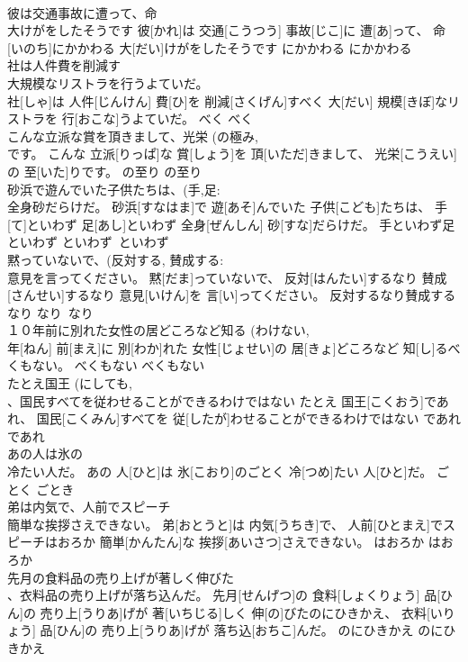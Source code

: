\documentclass[8pt]{extreport}
\begin{document}
\begin{CJK}{UTF8}{min}
\\	彼は交通事故に遭って、命 
\\	大けがをしたそうです	彼[かれ]は 交通[こうつう] 事故[じこ]に 遭[あ]って、 命[いのち]にかかわる 大[だい]けがをしたそうです	にかかわる	にかかわる	
\\	社は人件費を削減す 
\\	大規模なリストラを行うよていだ。	
\\	社[しゃ]は 人件[じんけん] 費[ひ]を 削減[さくげん]すべく 大[だい] 規模[きぼ]なリストラを 行[おこな]うよていだ。	べく	べく	
\\	こんな立派な賞を頂きまして、光栄 (の極み, 
\\	です。	こんな 立派[りっぱ]な 賞[しょう]を 頂[いただ]きまして、 光栄[こうえい]の 至[いた]りです。	の至り	の至り	
\\	砂浜で遊んでいた子供たちは、(手,足: 
\\	全身砂だらけだ。	砂浜[すなはま]で 遊[あそ]んでいた 子供[こども]たちは、 手[て]といわず 足[あし]といわず 全身[ぜんしん] 砂[すな]だらけだ。	手といわず足といわず	といわず~といわず	
\\	黙っていないで、(反対する, 賛成する: 
\\	意見を言ってください。	黙[だま]っていないで、 反対[はんたい]するなり 賛成[さんせい]するなり 意見[いけん]を 言[い]ってください。	反対するなり賛成するなり	なり~なり	
\\	１０年前に別れた女性の居どころなど知る (わけない, 
\\	年[ねん] 前[まえ]に 別[わか]れた 女性[じょせい]の 居[きょ]どころなど 知[し]るべくもない。	べくもない	べくもない	
\\	たとえ国王 (にしても, 
\\	、国民すべてを従わせることができるわけではない	たとえ 国王[こくおう]であれ、 国民[こくみん]すべてを 従[したが]わせることができるわけではない	であれ	であれ	
\\	あの人は氷の 
\\	冷たい人だ。	あの 人[ひと]は 氷[こおり]のごとく 冷[つめ]たい 人[ひと]だ。	ごとく	ごとき	
\\	弟は内気で、人前でスピーチ 
\\	簡単な挨拶さえできない。	弟[おとうと]は 内気[うちき]で、 人前[ひとまえ]でスピーチはおろか 簡単[かんたん]な 挨拶[あいさつ]さえできない。	はおろか	はおろか	
\\	先月の食料品の売り上げが著しく伸びた 
\\	、衣料品の売り上げが落ち込んだ。	先月[せんげつ]の 食料[しょくりょう] 品[ひん]の 売り上[うりあ]げが 著[いちじる]しく 伸[の]びたのにひきかえ、 衣料[いりょう] 品[ひん]の 売り上[うりあ]げが 落ち込[おちこ]んだ。	のにひきかえ	のにひきかえ	

\end{CJK}
\end{document}
